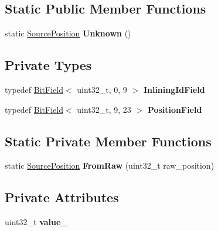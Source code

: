\subsection*{Static Public Member Functions}
\begin{DoxyCompactItemize}
\item 
static \hyperlink{classv8_1_1internal_1_1_source_position}{Source\+Position} {\bfseries Unknown} ()\hypertarget{classv8_1_1internal_1_1_source_position_a55c6238897a170cf326f1387d12fddc3}{}\label{classv8_1_1internal_1_1_source_position_a55c6238897a170cf326f1387d12fddc3}

\end{DoxyCompactItemize}
\subsection*{Private Types}
\begin{DoxyCompactItemize}
\item 
typedef \hyperlink{classv8_1_1internal_1_1_bit_field}{Bit\+Field}$<$ uint32\+\_\+t, 0, 9 $>$ {\bfseries Inlining\+Id\+Field}\hypertarget{classv8_1_1internal_1_1_source_position_a83545cd72766f36320d9c1df200f1a56}{}\label{classv8_1_1internal_1_1_source_position_a83545cd72766f36320d9c1df200f1a56}

\item 
typedef \hyperlink{classv8_1_1internal_1_1_bit_field}{Bit\+Field}$<$ uint32\+\_\+t, 9, 23 $>$ {\bfseries Position\+Field}\hypertarget{classv8_1_1internal_1_1_source_position_a24ff07b0d7c6548a55fda829ef122f72}{}\label{classv8_1_1internal_1_1_source_position_a24ff07b0d7c6548a55fda829ef122f72}

\end{DoxyCompactItemize}
\subsection*{Static Private Member Functions}
\begin{DoxyCompactItemize}
\item 
static \hyperlink{classv8_1_1internal_1_1_source_position}{Source\+Position} {\bfseries From\+Raw} (uint32\+\_\+t raw\+\_\+position)\hypertarget{classv8_1_1internal_1_1_source_position_ac5d8e2595cec787db5c66ecf505de465}{}\label{classv8_1_1internal_1_1_source_position_ac5d8e2595cec787db5c66ecf505de465}

\end{DoxyCompactItemize}
\subsection*{Private Attributes}
\begin{DoxyCompactItemize}
\item 
uint32\+\_\+t {\bfseries value\+\_\+}\hypertarget{classv8_1_1internal_1_1_source_position_ac76db09f1b67f2c6927deae80904e1d9}{}\label{classv8_1_1internal_1_1_source_position_ac76db09f1b67f2c6927deae80904e1d9}

\end{DoxyCompactItemize}

